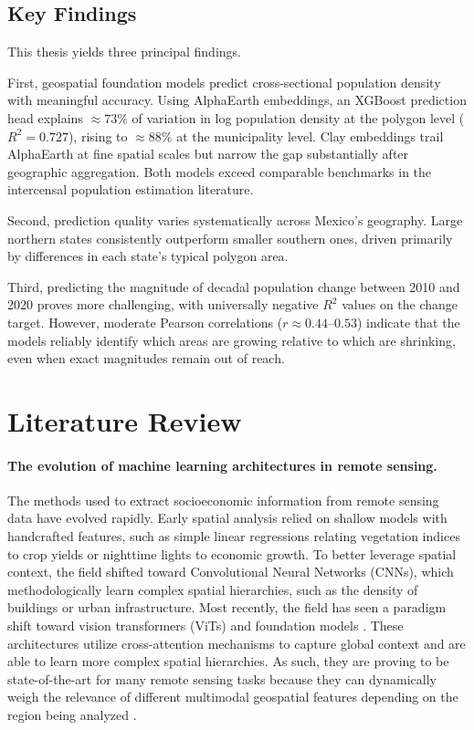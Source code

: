 \documentclass[12pt,letterpaper]{article}
\begin{document}
\subsection{Key Findings}
This thesis yields three principal findings. 

First, geospatial foundation models predict cross-sectional population density with meaningful accuracy. Using AlphaEarth embeddings, an XGBoost prediction head explains $\approx73\%$ of variation in log population density at the polygon level ($R^2 = 0.727$), rising to $\approx88\%$ at the municipality level. Clay embeddings trail AlphaEarth at fine spatial scales but narrow the gap substantially after geographic aggregation. Both models exceed comparable benchmarks in the intercensal population estimation literature.

Second, prediction quality varies systematically across Mexico's geography. Large northern states consistently outperform smaller southern ones, driven primarily by differences in each state's typical polygon area.

Third, predicting the magnitude of decadal population change between 2010 and 2020 proves more challenging, with universally negative $R^2$ values on the change target. However, moderate Pearson correlations ($r \approx0.44$--$0.53$) indicate that the models reliably identify which areas are growing relative to which are shrinking, even when exact magnitudes remain out of reach.

\newpage

\section{Literature Review}

\paragraph{The evolution of machine learning architectures in remote sensing.} The methods used to extract socioeconomic information from remote sensing data have evolved rapidly. Early spatial analysis relied on shallow models with handcrafted features, such as simple linear regressions relating vegetation indices to crop yields or nighttime lights to economic growth. To better leverage spatial context, the field shifted toward Convolutional Neural Networks (CNNs), which methodologically learn complex spatial hierarchies, such as the density of buildings or urban infrastructure. Most recently, the field has seen a paradigm shift toward vision transformers (ViTs) and foundation models \parencite{zheng2025dynamic}. These architectures utilize cross-attention mechanisms to capture global context and are able to learn more complex spatial hierarchies. As such, they are proving to be state-of-the-art for many remote sensing tasks because they can dynamically weigh the relevance of different multimodal geospatial features depending on the region being analyzed \parencite{zheng2025dynamic}.
\end{document}
